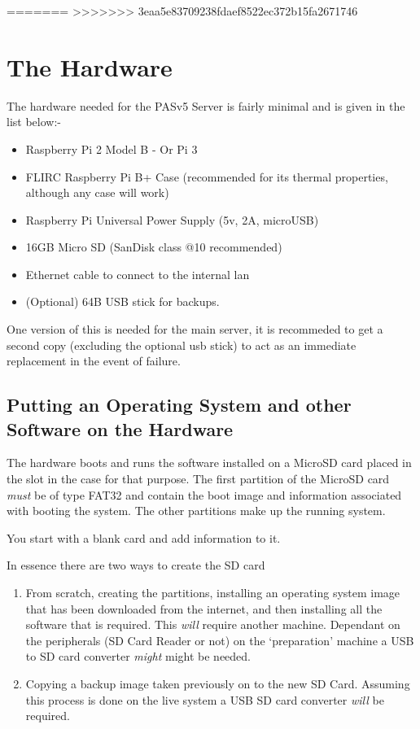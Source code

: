 \documentclass[Draft]{akc}
\begin{document}
=======
>>>>>>> 3eaa5e83709238fdaef8522ec372b15fa2671746
\section{The Hardware}

The hardware needed for the PASv5 Server is fairly minimal and is given in the list below:-

\begin{itemize}
\item Raspberry Pi 2 Model B - Or Pi 3
\item FLIRC Raspberry Pi B+ Case (recommended for its thermal properties, although any case will work)
\item Raspberry Pi Universal Power Supply (5v, 2A, microUSB)
\item 16GB Micro SD (SanDisk class @10 recommended)
\item Ethernet cable to connect to the internal lan
\item (Optional) 64B USB stick for backups.
\end{itemize}

One version of this is needed for the main server, it is recommeded to get a second copy (excluding
the optional usb stick) to act as an immediate replacement in the event of failure.

\subsection{Putting an Operating System and other Software on the Hardware}

The hardware boots and runs the software installed on a MicroSD card placed in the slot in the case
for that purpose.  The first partition of the MicroSD card \emph{must} be of type FAT32 and contain
the boot image and information associated with booting the system.  The other partitions make up the
running system.

You start with a blank card and add information to it.

In essence there are two ways to create the SD card
\begin{enumerate}
\item From scratch, creating the partitions, installing an operating system image that has been
downloaded from the internet, and then installing all the software that is required.  This
\emph{will} require another machine.  Dependant on the peripherals (SD Card Reader or not) on the
`preparation' machine a USB to SD card converter  \emph{might} might be needed.
\item Copying a backup image taken previously on to the new SD Card.  Assuming this process is done
on the live system a USB SD card converter \emph{will} be required.
\end{enumerate}
\end{document}
